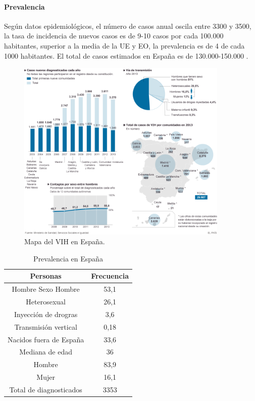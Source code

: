 \documentclass[a4paper,twocolumn,10pt]{article}
\begin{document}
\paragraph{Prevalencia}
Según datos epidemiológicos, el número de casos anual oscila entre 3300 y 3500, la tasa de incidencia de nuevos casos es de 9-10 casos por cada 100.000 habitantes, superior a la media de la UE y EO, la prevalencia es de 4 de cada 1000 habitantes. El total de casos estimados en España es de 130.000-150.000 \cite{Molina2018}. 
\begin{figure}[htb]
\centering
\includegraphics[width=0.9\textwidth]{./sida}
\caption{Mapa del VIH en España. \cite{Benito2014}}
\label{fig:VIH}
\end{figure}
\begin{table}[htbp]
\begin{center}
\begin{tabular}{|c|c|}
\hline 
{\cellcolor[gray]{0.7} \bfseries Personas} & {\cellcolor[gray]{0.7} \bfseries Frecuencia} \\ \hline 
Hombre Sexo Hombre & 53,1 \\ \hline
Heterosexual & 26,1 \\ \hline
Inyección de drogras & 3,6 \\ \hline
Transmisión vertical & 0,18 \\ \hline
Nacidos fuera de España & 33,6 \\ \hline
Mediana de edad & 36 \\ \hline
Hombre & 83,9 \\ \hline
Mujer & 16,1 \\ \hline 
Total de diagnosticados & 3353 \\ \hline 
\end{tabular}
\caption{Prevalencia en España \cite{Molina2018}}
\label{tabla:Prevalencia}
\end{center}
\end{table}
\end{document}
